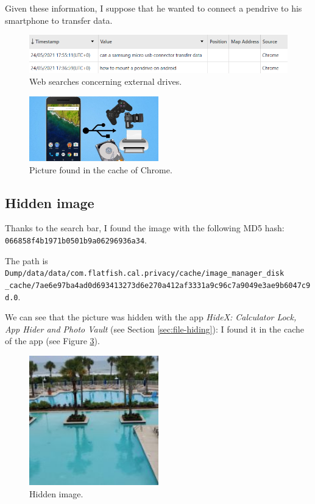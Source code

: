 \documentclass[12pt]{article}
\begin{document}
Given these information, I suppose that he wanted to connect a pendrive to his smartphone to transfer data.

\begin{figure}[!ht]
    \centering
    \includegraphics[width=\textwidth]{images/web-searches.png}
    \caption{Web searches concerning external drives.}
    \label{fig:web}
\end{figure}

\begin{figure}
    \centering
    \includegraphics[width=0.5\textwidth]{images/android-usb-otg.jpg}
    \caption{Picture found in the cache of Chrome.}
    \label{fig:usb}
\end{figure}

\subsection{Hidden image}

Thanks to the search bar, I found the image with the following MD5 hash: \\
\texttt{066858f4b1971b0501b9a06296936a34}. 

The path is \texttt{Dump/data/data/com.flatfish.cal.privacy/cache/image\_manager\_disk \\ \_cache/7ae6e97ba4ad0d693413273d6e270a412af3331a9c96c7a9049e3ae9b6047c9d.0}.

We can see that the picture was hidden with the app \textit{HideX: Calculator Lock, App Hider and Photo Vault} (see Section \ref{sec:file-hiding}): I found it in the cache of the app (see Figure \ref{fig:cache}).

\begin{figure}[!ht]
    \centering
    \includegraphics[width=0.5\textwidth]{images/hidden.png}
    \caption{Hidden image.}
    \label{fig:cache}
\end{figure}
\end{document}
